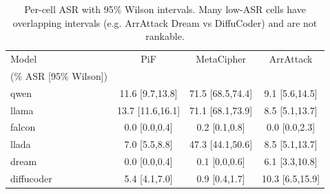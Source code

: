 \begin{table}[t]
\centering
\small
\begin{tabular}{lccc}
\toprule
Model & PiF & MetaCipher & ArrAttack \\ (\% ASR [95\% Wilson]) & & & \\
\midrule
qwen & 11.6 [9.7,13.8] & 71.5 [68.5,74.4] & 9.1 [5.6,14.5] \\
llama & 13.7 [11.6,16.1] & 71.1 [68.1,73.9] & 8.5 [5.1,13.7] \\
falcon & 0.0 [0.0,0.4] & 0.2 [0.1,0.8] & 0.0 [0.0,2.3] \\
llada & 7.0 [5.5,8.8] & 47.3 [44.1,50.6] & 8.5 [5.1,13.7] \\
dream & 0.0 [0.0,0.4] & 0.1 [0.0,0.6] & 6.1 [3.3,10.8] \\
diffucoder & 5.4 [4.1,7.0] & 0.9 [0.4,1.7] & 10.3 [6.5,15.9] \\
\bottomrule
\end{tabular}
\caption{Per-cell ASR with 95\% Wilson intervals. Many low-ASR cells have overlapping intervals (e.g. ArrAttack Dream vs DiffuCoder) and are not rankable.}
\label{tab:wilson}
\end{table}
